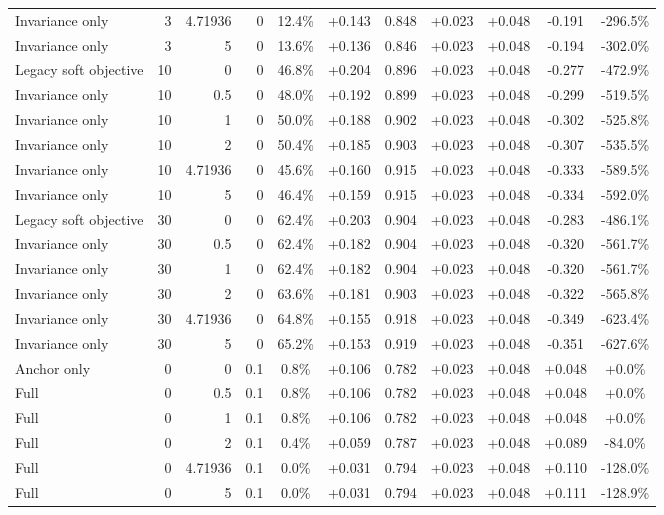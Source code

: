 \begin{table}[htbp]
\begin{tabular}{lrrrccccccc}
Invariance only & 3 & 4.71936 & 0 & 12.4\% & +0.143 & 0.848 & +0.023 & +0.048 & -0.191 & -296.5\% \\
Invariance only & 3 & 5 & 0 & 13.6\% & +0.136 & 0.846 & +0.023 & +0.048 & -0.194 & -302.0\% \\
Legacy soft objective & 10 & 0 & 0 & 46.8\% & +0.204 & 0.896 & +0.023 & +0.048 & -0.277 & -472.9\% \\
Invariance only & 10 & 0.5 & 0 & 48.0\% & +0.192 & 0.899 & +0.023 & +0.048 & -0.299 & -519.5\% \\
Invariance only & 10 & 1 & 0 & 50.0\% & +0.188 & 0.902 & +0.023 & +0.048 & -0.302 & -525.8\% \\
Invariance only & 10 & 2 & 0 & 50.4\% & +0.185 & 0.903 & +0.023 & +0.048 & -0.307 & -535.5\% \\
Invariance only & 10 & 4.71936 & 0 & 45.6\% & +0.160 & 0.915 & +0.023 & +0.048 & -0.333 & -589.5\% \\
Invariance only & 10 & 5 & 0 & 46.4\% & +0.159 & 0.915 & +0.023 & +0.048 & -0.334 & -592.0\% \\
Legacy soft objective & 30 & 0 & 0 & 62.4\% & +0.203 & 0.904 & +0.023 & +0.048 & -0.283 & -486.1\% \\
Invariance only & 30 & 0.5 & 0 & 62.4\% & +0.182 & 0.904 & +0.023 & +0.048 & -0.320 & -561.7\% \\
Invariance only & 30 & 1 & 0 & 62.4\% & +0.182 & 0.904 & +0.023 & +0.048 & -0.320 & -561.7\% \\
Invariance only & 30 & 2 & 0 & 63.6\% & +0.181 & 0.903 & +0.023 & +0.048 & -0.322 & -565.8\% \\
Invariance only & 30 & 4.71936 & 0 & 64.8\% & +0.155 & 0.918 & +0.023 & +0.048 & -0.349 & -623.4\% \\
Invariance only & 30 & 5 & 0 & 65.2\% & +0.153 & 0.919 & +0.023 & +0.048 & -0.351 & -627.6\% \\
Anchor only & 0 & 0 & 0.1 & 0.8\% & +0.106 & 0.782 & +0.023 & +0.048 & +0.048 & +0.0\% \\
Full & 0 & 0.5 & 0.1 & 0.8\% & +0.106 & 0.782 & +0.023 & +0.048 & +0.048 & +0.0\% \\
Full & 0 & 1 & 0.1 & 0.8\% & +0.106 & 0.782 & +0.023 & +0.048 & +0.048 & +0.0\% \\
Full & 0 & 2 & 0.1 & 0.4\% & +0.059 & 0.787 & +0.023 & +0.048 & +0.089 & -84.0\% \\
Full & 0 & 4.71936 & 0.1 & 0.0\% & +0.031 & 0.794 & +0.023 & +0.048 & +0.110 & -128.0\% \\
Full & 0 & 5 & 0.1 & 0.0\% & +0.031 & 0.794 & +0.023 & +0.048 & +0.111 & -128.9\% \\

\end{tabular}
\end{table}
